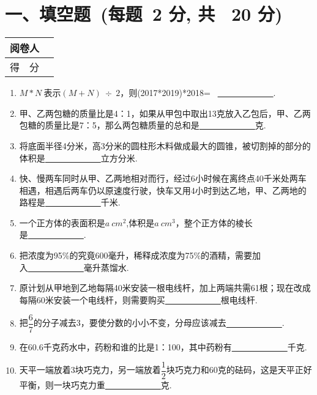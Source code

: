 \documentclass[twocolumn,landscape,UTF8]{ctexart}
\begin{document}
\section*{\hspace{5cm} 一、填空题~(每题~2 分, 共~ 20 分)}
\vspace{-1cm}

\begin{tabular}{|p{}|p{}|}
			\hline
			\centering 阅卷人& \\
			\hline
			\centering 得~~分 &  \\
			\hline
		\end{tabular}
		\begin{enumerate}\setcounter{enumi}{0}
			\item $M*N~$表示$(M+N)~\div~2$，则(2017*2019)*2018= ~\underline{~~~~~~~~~~~~~}.
			
			\item 甲、乙两包糖的质量比是4：1，如果从甲包中取出13克放入乙包后，甲、乙两包糖的质量比是7：5，那么两包糖质量的总和是\underline{~~~~~~~~~~~~~}克.
			
			\item 将底面半径4分米，高3分米的圆柱形木料做成最大的圆锥，被切割掉的部分的体积是\underline{~~~~~~~~~~~~~}立方分米.
			
            \item 快、慢两车同时从甲、乙两地相对而行，经过6小时候在离终点40千米处两车相遇，相遇后两车仍以原速度行驶，快车又用4小时到达乙地，甲、乙两地的路程是\underline{~~~~~~~~~~~~~}千米.
			
			\item 一个正方体的表面积是$a~cm^2$,体积是$a~cm^3$，整个正方体的棱长是\underline{~~~~~~~~~~~~~}.

            \item 把浓度为95\%的究竟600毫升，稀释成浓度为75\%的酒精，需要加入\underline{~~~~~~~~~~~~~}毫升蒸馏水.

            \item 原计划从甲地到乙地每隔40米安装一根电线杆，加上两端共需61根；现在改成每隔60米安装一个电线杆，则需要购买\underline{~~~~~~~~~~~~~}根电线杆.

            \item 把$\dfrac{6}{7}$的分子减去3，要使分数的小小不变，分母应该减去\underline{~~~~~~~~~~~~~}.

            \item 在60.6千克药水中，药粉和谁的比是1：100，其中药粉有\underline{~~~~~~~~~~~~~}千克.

            \item 天平一端放着3块巧克力，另一端放着$\dfrac{1}{2}$块巧克力和60克的砝码，这是天平正好平衡，则一块巧克力重\underline{~~~~~~~~~~~~~}克.

		\end{enumerate}
\newpage
\end{document}
